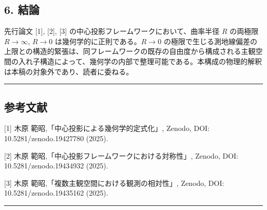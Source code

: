 \documentclass[a4paper,11pt]{ltjsarticle}
\theoremstyle{definition}
\begin{document}
\subsection{6. 結論}\label{ux7d50ux8ad6}

先行論文 {[}1{]}, {[}2{]}, {[}3{]} の中心投影フレームワークにおいて、曲率半径 \(R\) の両極限 \(R \to \infty\), \(R \to 0\) は幾何学的に正則である。\(R \to 0\) の極限で生じる測地線偏差の上限との構造的緊張は、同フレームワークの既存の自由度から構成される主観空間の入れ子構造によって、幾何学の内部で整理可能である。本構成の物理的解釈は本稿の対象外であり、読者に委ねる。

\begin{center}\rule{0.5\linewidth}{0.5pt}\end{center}

\subsection{参考文献}\label{ux53c2ux8003ux6587ux732e}

{[}1{]} 木原 範昭,「中心投影による幾何学的定式化」, Zenodo, DOI: 10.5281/zenodo.19427780 (2025).

{[}2{]} 木原 範昭,「中心投影フレームワークにおける対称性」, Zenodo, DOI: 10.5281/zenodo.19434932 (2025).

{[}3{]} 木原 範昭,「複数主観空間における観測の相対性」, Zenodo, DOI: 10.5281/zenodo.19435162 (2025).

\begin{center}\rule{0.5\linewidth}{0.5pt}\end{center}
\end{document}
